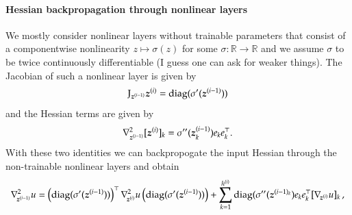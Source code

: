 \paragraph{Hessian backpropagation through nonlinear layers}
We mostly consider nonlinear layers without trainable parameters that consist of a componentwise nonlinearity $z\mapsto \sigma(z)$ for some $\sigma\colon\mathbb R\to\mathbb R$ and we assume $\sigma$ to be twice continuously differentiable (I guess one can ask for weaker things). 
The Jacobian of such a nonlinear layer is given by 
\begin{equation}
    \mathrm{J}_{{\boldsymbol{z}}^{(i-1)}}{\boldsymbol{z}}^{(i)} = \operatorname{diag}(\sigma'({\boldsymbol{z}}^{(i-1)}))
\end{equation}
and the %
Hessian terms are given by
\begin{equation}
    \nabla^2_{{\boldsymbol{z}}^{(i-1)}}[{\boldsymbol{z}}^{(i)}]_k = \sigma''({\boldsymbol{z}}^{(i-1)}_k) e_k  e_k^\top.
\end{equation}
With these two identities we can backpropogate the input Hessian through the non-trainable nonlinear layers and obtain
\begin{equation}
    \nabla_{\!{{\boldsymbol{z}}^{(i-1)}}}^{2}u
    =
      \left( \operatorname{diag}(\sigma'({\boldsymbol{z}}^{(i-1)})) \right)^{\top}
      \nabla_{\!{{\boldsymbol{z}}^{(i)}}}^{2}u
      \left( \operatorname{diag}(\sigma'({\boldsymbol{z}}^{(i-1)})) \right)
      +
      \sum_{k=1}^{h^{(i)}}
      \operatorname{diag}(\sigma''({\boldsymbol{z}}^{(i-1)_k})
      e_k e_k^\top
      [\nabla_{\!{{\boldsymbol{z}}^{(i)}}} u]_k\,,
\end{equation}

